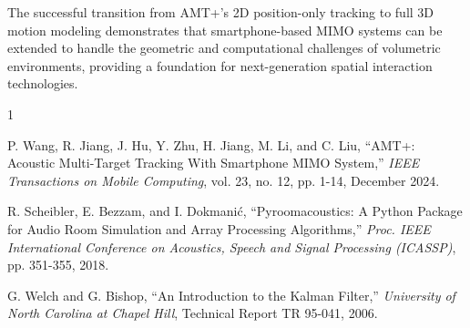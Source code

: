 \documentclass[a4paper]{article}
\begin{document}
The successful transition from AMT+'s 2D position-only tracking to full 3D motion modeling demonstrates that smartphone-based MIMO systems can be extended to handle the geometric and computational challenges of volumetric environments, providing a foundation for next-generation spatial interaction technologies.


\begin{thebibliography}{1}

P. Wang, R. Jiang, J. Hu, Y. Zhu, H. Jiang, M. Li, and C. Liu,
``AMT+: Acoustic Multi-Target Tracking With Smartphone MIMO System,''
{\em IEEE Transactions on Mobile Computing}, vol. 23, no. 12, pp. 1-14, December 2024.

R. Scheibler, E. Bezzam, and I. Dokmanić,
``Pyroomacoustics: A Python Package for Audio Room Simulation and Array Processing Algorithms,''
{\em Proc. IEEE International Conference on Acoustics, Speech and Signal Processing (ICASSP)}, pp. 351-355, 2018.

G. Welch and G. Bishop,
``An Introduction to the Kalman Filter,''
{\em University of North Carolina at Chapel Hill}, Technical Report TR 95-041, 2006.

\end{thebibliography}
\end{document}
